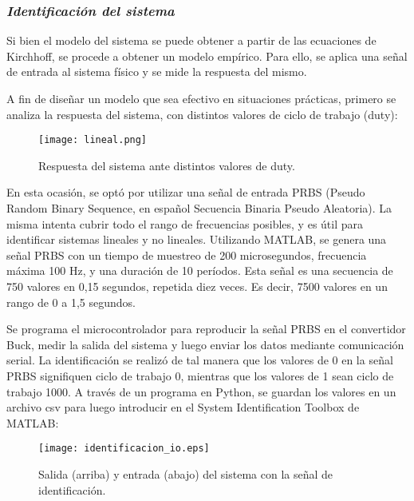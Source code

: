 \subsubsection*{\it{Identificación del sistema}}
\vspace{-0.25cm}
Si bien el modelo del sistema se puede obtener a partir de las ecuaciones de Kirchhoff, se procede
a obtener un modelo empírico. Para ello, se aplica una señal de entrada al sistema físico y se
mide la respuesta del mismo.

A fin de diseñar un modelo que sea efectivo en situaciones prácticas, primero se analiza la respuesta
del sistema, con distintos valores de ciclo de trabajo (duty):

\begin{figure}[H]
    \centering
    \texttt{[image: lineal.png]}
    \vspace{-0.25cm}
    \caption{Respuesta del sistema ante distintos valores de duty.}
    \label{fig:lineal}
\end{figure}

En esta ocasión, se optó por utilizar una señal de entrada PRBS
(Pseudo Random Binary Sequence, en español Secuencia Binaria Pseudo Aleatoria). La misma intenta
cubrir todo el rango de frecuencias posibles, y es útil para identificar sistemas lineales y no lineales.
Utilizando MATLAB, se genera una señal PRBS con un tiempo de muestreo de 200 microsegundos, frecuencia máxima
100 Hz, y una duración de 10 períodos. Esta señal es una secuencia de 750 valores en 0,15 segundos, repetida diez veces.
Es decir, 7500 valores en un rango de 0 a 1,5 segundos.

Se programa el microcontrolador para reproducir la señal PRBS en el convertidor Buck, medir la salida
del sistema y luego enviar los datos mediante comunicación serial. La identificación se realizó de tal manera 
que los valores de 0 en la señal PRBS signifiquen ciclo de trabajo 0, mientras que los valores de 1 sean ciclo
de trabajo 1000. A través de un programa en Python, se guardan los valores en un archivo csv para luego introducir en el
System Identification Toolbox de MATLAB:


\begin{figure}[H]
    \centering
    \texttt{[image: identificacion\_io.eps]}
    \vspace{-0.25cm}
    \caption{Salida (arriba) y entrada (abajo) del sistema con la señal de identificación.}
    \label{fig:identificacion_io}
\end{figure}


